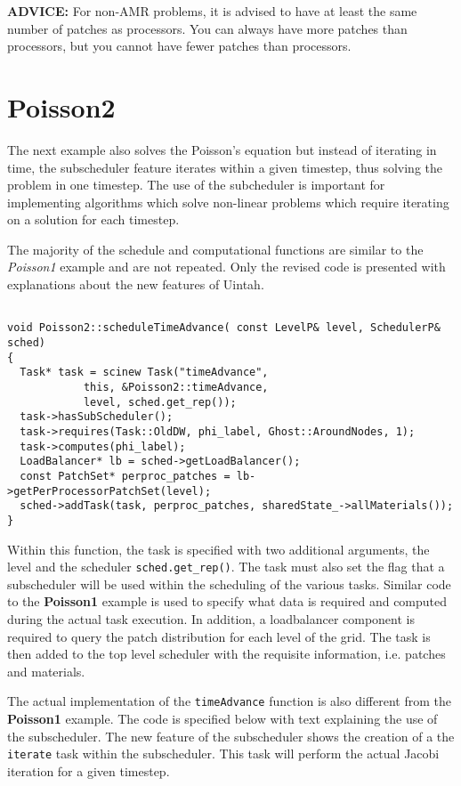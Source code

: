 \documentclass[12pt]{report}
\begin{document}
\textbf{ADVICE:} For non-AMR problems, it is advised to have at least
the same number of patches as processors.  You can always have more
patches than processors, but you cannot have fewer patches than
processors.


\section{Poisson2}

The next example also solves the Poisson's equation but instead of
iterating in time, the subscheduler feature iterates within a given
timestep, thus solving the problem in one timestep.  The use of the
subcheduler is important for implementing algorithms which solve
non-linear problems which require iterating on a solution for each
timestep.

The majority of the schedule and computational functions are similar
to the \emph{Poisson1} example and are not repeated.  Only the revised
code is presented with explanations about the new features of Uintah.

\begin{verbatim}

void Poisson2::scheduleTimeAdvance( const LevelP& level, SchedulerP& sched)
{
  Task* task = scinew Task("timeAdvance",
			this, &Poisson2::timeAdvance,
			level, sched.get_rep());
  task->hasSubScheduler();
  task->requires(Task::OldDW, phi_label, Ghost::AroundNodes, 1);
  task->computes(phi_label);
  LoadBalancer* lb = sched->getLoadBalancer();
  const PatchSet* perproc_patches = lb->getPerProcessorPatchSet(level);
  sched->addTask(task, perproc_patches, sharedState_->allMaterials());
}

\end{verbatim}

Within this function, the task is specified with two additional
arguments, the level and the scheduler \texttt{sched.get\_rep()}.  The
task must also set the flag that a subscheduler will be used within
the scheduling of the various tasks.  Similar code to the
\textbf{Poisson1} example is used to specify what data is required and
computed during the actual task execution.  In addition, a
loadbalancer component is required to query the patch distribution for
each level of the grid.  The task is then added to the top level
scheduler with the requisite information, i.e. patches and materials.

The actual implementation of the \texttt{timeAdvance} function is also
different from the \textbf{Poisson1} example.  The code is specified
below with text explaining the use of the subscheduler.  The new
feature of the subscheduler shows the creation of a the
\texttt{iterate} task within the subscheduler.  This task will perform
the actual Jacobi iteration for a given timestep.
\end{document}
